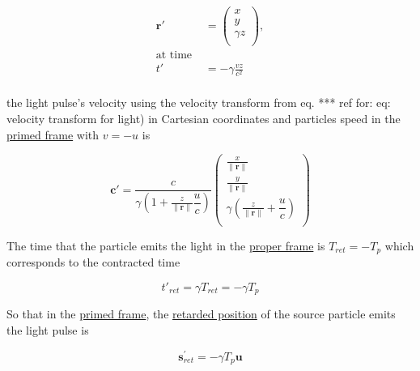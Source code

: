 \begin{equation}
	\label{eq: displacement transform}
	\begin{aligned}
		\mathbf{r}{'} & =
		\begin{pmatrix}
			x          \\
			y          \\
			{\gamma} z \\
		\end{pmatrix},                                  \\
		\text{at time \ \ \ }                           \\
		{t{'}}        & =-{\gamma} \frac{{v}{z}}{{c}^2} \\
	\end{aligned}
\end{equation}

the light pulse's velocity using the velocity transform from eq.
*** ref for: eq: velocity transform for light) in Cartesian coordinates and particles speed in the \hyperlink{def-Primed-Frame}{primed frame} with ${v} =-{u}$ is

\begin{equation}
	\label{eq: light pulse velocity transform}
	\mathbf{c}{'} = \dfrac{c}{{\gamma}\left(1 + \frac{z}{\|\mathbf{r}\|} \dfrac{u}{c} \right)}
	\begin{pmatrix}
		\frac{x}{\|\mathbf{r}\|}                                        \\
		\frac{y}{\|\mathbf{r}\|}                                        \\
		{\gamma} \left( \frac{z}{\|\mathbf{r}\|} + \dfrac{u}{c} \right) \\
	\end{pmatrix}
\end{equation}


The time that the particle emits the light in the \hyperlink{def-proper-frame}{proper frame} is ${T}_{ret} =-{T}_{p}$ which corresponds to the contracted time

\begin{equation}
	t{'}_{ret} = {\gamma} {T}_{ret} =-{\gamma} {T}_{p}
\end{equation}

So that in the \hyperlink{def-Primed-Frame}{primed frame}, the \hyperlink{def-retarded-position}{retarded position} of the source particle emits the light pulse is

\begin{equation}
	\mathbf{s}_{ret}^{'} =-{\gamma} {T}_{p} \mathbf{u}
\end{equation}

